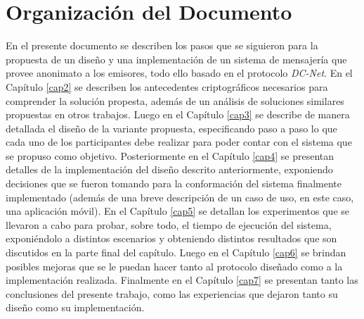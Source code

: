 \section{Organización del Documento}

En el presente documento se describen los pasos que se siguieron para la propuesta de un diseño y una implementación de un sistema de mensajería que 
provee anonimato a los emisores, todo ello basado en el protocolo \emph{DC-Net}. En el Capítulo \ref{cap2} se describen los antecedentes criptográficos 
necesarios para comprender la solución propesta, además de un análisis de soluciones similares propuestas en otros trabajos. Luego en el Capítulo \ref{cap3} 
se describe de manera detallada el diseño de la variante propuesta, especificando paso a paso lo que cada uno de los participantes debe realizar 
para poder contar con el sistema que se propuso como objetivo. Posteriormente en el Capítulo \ref{cap4} se presentan detalles de la implementación del diseño 
descrito anteriormente, exponiendo decisiones que se fueron tomando para la conformación del sistema finalmente implementado (además de una breve 
descripción de un caso de uso, en este caso, una aplicación móvil). En el Capítulo \ref{cap5} se detallan los experimentos que se llevaron a cabo para probar, 
sobre todo, el tiempo de ejecución del sistema, exponiéndolo a distintos escenarios y obteniendo distintos resultados que son discutidos en la parte 
final del capítulo. Luego en el Capítulo \ref{cap6} se 
brindan posibles mejoras que se le puedan hacer tanto al protocolo diseñado como a la implementación realizada. Finalmente en el Capítulo \ref{cap7} se 
presentan tanto las conclusiones del presente trabajo, como las experiencias que dejaron tanto su diseño como su implementación.
